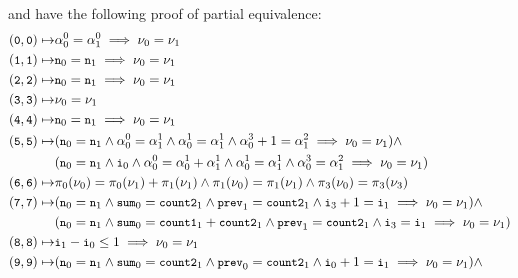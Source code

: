 %
 and  have the following proof of
partial equivalence:
%
\begin{align*}
  (\cc{0}, \cc{0}) \mapsto & %
  \alpha_0^0 = \alpha_1^0 \implies \nu_0 = \nu_1 \\
  (\cc{1}, \cc{1}) \mapsto & %
  \cc{n}_0 = \cc{n}_1 \implies \nu_0 = \nu_1 \\
  (\cc{2}, \cc{2}) \mapsto & %
  \cc{n}_0 = \cc{n}_1 \implies \nu_0 = \nu_1 \\
  (\cc{3}, \cc{3}) \mapsto & \nu_0 = \nu_1 \\
  (\cc{4}, \cc{4}) \mapsto & %
  \cc{n}_0 = \cc{n}_1 \implies \nu_0 = \nu_1 \\
  (\cc{5}, \cc{5}) \mapsto & %
  (\cc{n}_0 = \cc{n}_1 \land %
  \alpha_0^0 = \alpha_1^1 \land %
  \alpha_0^1 = \alpha_1^1 \land %
  \alpha_0^3 + 1 = \alpha_1^2 \implies %
  \nu_0 = \nu_1) \land \\
  & (\cc{n}_0 = \cc{n}_1 \land \cc{i}_0 \land %
  \alpha_0^0 = \alpha_0^1 + \alpha_1^1 \land %
  \alpha_0^1 = \alpha_1^1 \land %
  \alpha_0^3 = \alpha_1^2 \implies %
  \nu_0 = \nu_1) \\
  (\cc{6}, \cc{6}) \mapsto & %
  \pi_0(\nu_0) = \pi_0(\nu_1) + \pi_1(\nu_1) \land %
  \pi_1(\nu_0) = \pi_1(\nu_1) \land %
  \pi_3(\nu_0) = \pi_3(\nu_3) \\
  (\cc{7}, \cc{7}) \mapsto & 
  (\cc{n}_0 = \cc{n}_1 \land %
  \cc{sum}_0 = \cc{count2}_1 \land %
  \cc{prev}_1 = \cc{count2}_1 \land %
  \cc{i}_3 + 1 = \cc{i}_1 \implies %
  \nu_0 = \nu_1) \land \\
  & (\cc{n}_0 = \cc{n}_1 \land %
  \cc{sum}_0 = \cc{count1}_1 + \cc{count2}_1 \land %
  \cc{prev}_1 = \cc{count2}_1 \land %
  \cc{i}_3 = \cc{i}_1 \implies %
  \nu_0 = \nu_1) \\
  (\cc{8}, \cc{8}) \mapsto & \cc{i}_1 - \cc{i}_0 \leq 1 \implies %
  \nu_0 = \nu_1 \\
  (\cc{9}, \cc{9}) \mapsto & 
  (\cc{n}_0 = \cc{n}_1 \land %
  \cc{sum}_0 = \cc{count2}_1 \land %
  \cc{prev}_0 = \cc{count2}_1 \land %
  \cc{i}_0 + 1 = \cc{i}_1 \implies %
  \nu_0 = \nu_1) \land \\

\end{align*}
